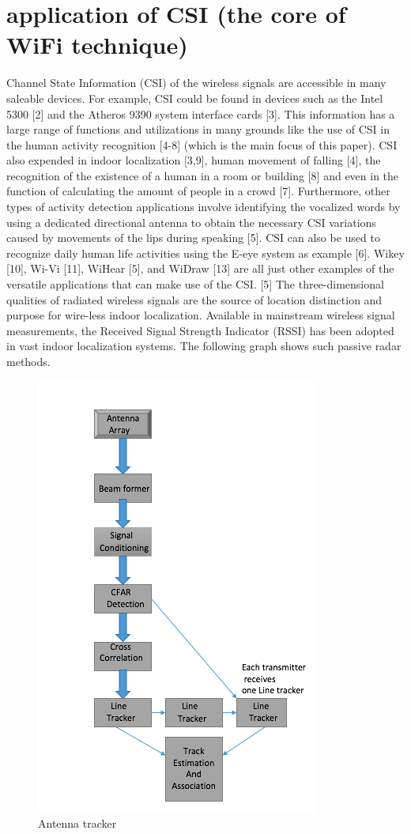 \documentclass[conference]{IEEEtran}
\begin{document}
\section{application of CSI (the core of WiFi technique)}
Channel State Information (CSI) of the wireless signals are accessible in many saleable devices. For example, CSI could be found in devices such as the Intel 5300 [2] and the Atheros 9390 system interface cards [3].  This information has a large range of functions and utilizations in many grounds like the use of CSI in the human activity recognition [4-8] (which is the main focus of this paper). CSI also expended in indoor localization [3,9],  human movement  of  falling  [4],  the  recognition  of  the existence of a human in a room or building [8] and even in the function of calculating the amount of people in a crowd [7]. Furthermore, other types of activity detection applications involve identifying the vocalized words by using a dedicated directional antenna to obtain the necessary CSI variations caused by movements of the lips during speaking [5]. \newline
CSI can also be used to recognize daily human life activities using the E-eye system as example [6]. Wikey  [10],  Wi-Vi  [11],  WiHear  [5],  and WiDraw [13] are all just other examples of the versatile applications that can make use  of the CSI. [5]
The three-dimensional qualities of radiated wireless signals are the source of location distinction and purpose for wire-less indoor localization. Available in mainstream wireless signal measurements, the Received Signal Strength Indicator (RSSI) has been adopted in vast indoor localization systems. The following graph shows such passive radar methods.

\begin{figure}[h!]
    \includegraphics[scale=0.45]{Figure11.png}
    \caption{Antenna tracker}
    \label{fig:me}
\end{figure}
\end{document}
